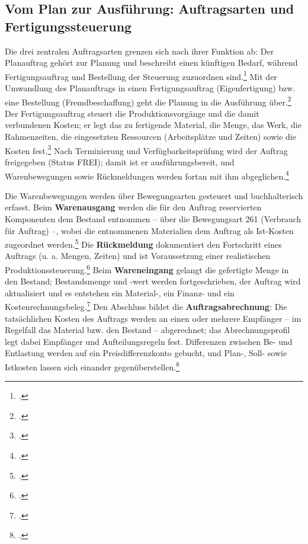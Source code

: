 \subsection{Vom Plan zur Ausführung: Auftragsarten und Fertigungssteuerung}
Die drei zentralen Auftragsarten grenzen sich nach ihrer Funktion ab: Der Planauftrag gehört zur Planung und beschreibt einen künftigen Bedarf, während Fertigungsauftrag und Bestellung der Steuerung zuzuordnen sind.\footcite[Vgl.][Folie 45]{SAPUCC.2023} Mit der Umwandlung des Planauftrags in einen Fertigungsauftrag (Eigenfertigung) bzw. eine Bestellung (Fremdbeschaffung) geht die Planung in die Ausführung über.\footcite[Vgl.][Folie 44 f.]{SAPUCC.2023} Der Fertigungsauftrag steuert die Produktionsvorgänge und die damit verbundenen Kosten; er legt das zu fertigende Material, die Menge, das Werk, die Rahmenzeiten, die eingesetzten Ressourcen (Arbeitsplätze und Zeiten) sowie die Kosten fest.\footcite[Vgl.][Folie 47 f.]{SAPUCC.2023} Nach Terminierung und Verfügbarkeitsprüfung wird der Auftrag freigegeben (Status FREI); damit ist er ausführungsbereit, und Warenbewegungen sowie Rückmeldungen werden fortan mit ihm abgeglichen.\footcite[Vgl.][Folie 49 f. u. 52]{SAPUCC.2023}

Die Warenbewegungen werden über Bewegungsarten gesteuert und buchhalterisch erfasst. Beim \textbf{Warenausgang} werden die für den Auftrag reservierten Komponenten dem Bestand entnommen -- über die Bewegungsart 261 (Verbrauch für Auftrag) --, wobei die entnommenen Materialien dem Auftrag als Ist-Kosten zugeordnet werden.\footcites[Vgl.][Folie 54]{SAPUCC.2023}[][S. 34 f. (Bewegungsart 261)]{Boldau.2023} Die \textbf{Rückmeldung} dokumentiert den Fortschritt eines Auftrags (u. a. Mengen, Zeiten) und ist Voraussetzung einer realistischen Produktionssteuerung.\footcite[Vgl.][Folie 55]{SAPUCC.2023} Beim \textbf{Wareneingang} gelangt die gefertigte Menge in den Bestand; Bestandsmenge und -wert werden fortgeschrieben, der Auftrag wird aktualisiert und es entstehen ein Material-, ein Finanz- und ein Kostenrechnungsbeleg.\footcite[Vgl.][Folie 56]{SAPUCC.2023} Den Abschluss bildet die \textbf{Auftragsabrechnung}: Die tatsächlichen Kosten des Auftrags werden an einen oder mehrere Empfänger -- im Regelfall das Material bzw. den Bestand -- abgerechnet; das Abrechnungsprofil legt dabei Empfänger und Aufteilungsregeln fest. Differenzen zwischen Be- und Entlastung werden auf ein Preisdifferenzkonto gebucht, und Plan-, Soll- sowie Istkosten lassen sich einander gegenüberstellen.\footcite[Vgl.][Folie 57 ff.]{SAPUCC.2023}

